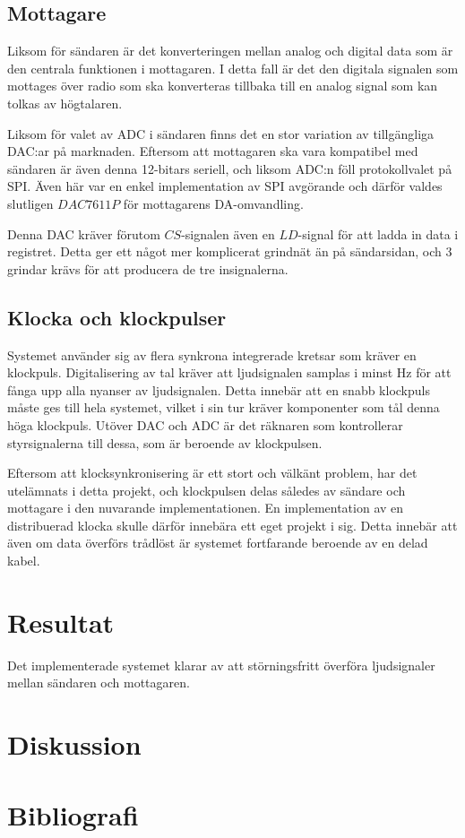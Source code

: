 \documentclass[a4paper,10pt]{article}
\begin{document}



\subsection{Mottagare}

Liksom för sändaren är det konverteringen mellan analog och digital data som
är den centrala funktionen i mottagaren. I detta fall är det den digitala 
signalen som mottages över radio som ska konverteras tillbaka till en analog
signal som kan tolkas av högtalaren.

Liksom för valet av ADC i sändaren finns det en stor variation av tillgängliga 
DAC:ar på marknaden. Eftersom att mottagaren ska vara kompatibel med sändaren
är även denna 12-bitars seriell, och liksom ADC:n föll protokollvalet på SPI. 
Även här var en enkel implementation av SPI avgörande och därför valdes 
slutligen $DAC7611P$ för mottagarens DA-omvandling. 

Denna DAC kräver förutom $CS$-signalen även en $LD$-signal för att ladda in data
i registret. Detta ger ett något mer komplicerat grindnät än på sändarsidan, och
3 grindar krävs för att producera de tre insignalerna.



\subsection{Klocka och klockpulser}

Systemet använder sig av flera synkrona integrerade kretsar som kräver en
klockpuls. Digitalisering av tal kräver att ljudsignalen samplas i minst 
 Hz för att fånga upp alla nyanser av ljudsignalen. Detta innebär att 
en snabb klockpuls måste ges till hela systemet, vilket i sin tur kräver 
komponenter som tål denna höga klockpuls. Utöver DAC och ADC är det räknaren som 
kontrollerar styrsignalerna till dessa, som är beroende av klockpulsen. 

Eftersom att klocksynkronisering är ett stort och välkänt problem, har det 
utelämnats i detta projekt, och klockpulsen delas således av sändare och 
mottagare i den nuvarande implementationen. En implementation av en distribuerad 
klocka skulle därför innebära ett eget projekt i sig. Detta innebär att även om 
data överförs trådlöst är systemet fortfarande beroende av en delad kabel. 


\section{Resultat}

Det implementerade systemet klarar av att störningsfritt överföra ljudsignaler
mellan sändaren och mottagaren. 

\section{Diskussion}

\section{Bibliografi}

\begin{thebibliography}{hejhej}

\end{thebibliography}
\end{document}
